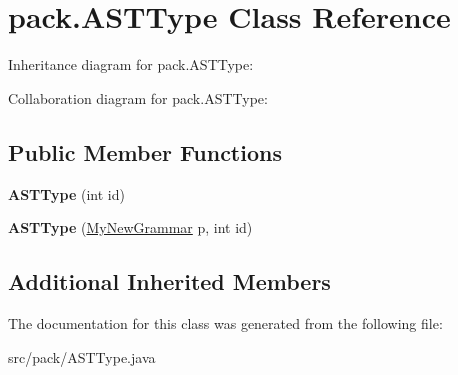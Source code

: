 \hypertarget{classpack_1_1_a_s_t_type}{}\section{pack.\+A\+S\+T\+Type Class Reference}
\label{classpack_1_1_a_s_t_type}


Inheritance diagram for pack.\+A\+S\+T\+Type\+:


Collaboration diagram for pack.\+A\+S\+T\+Type\+:
\subsection*{Public Member Functions}
\begin{DoxyCompactItemize}
\item 
{\bfseries A\+S\+T\+Type} (int id)\hypertarget{classpack_1_1_a_s_t_type_a591d0cb2add5c6327eb4b6ac34ef5885}{}\label{classpack_1_1_a_s_t_type_a591d0cb2add5c6327eb4b6ac34ef5885}

\item 
{\bfseries A\+S\+T\+Type} (\hyperlink{classpack_1_1_my_new_grammar}{My\+New\+Grammar} p, int id)\hypertarget{classpack_1_1_a_s_t_type_a686f76d1bf82aff1f322f4334a90f848}{}\label{classpack_1_1_a_s_t_type_a686f76d1bf82aff1f322f4334a90f848}

\end{DoxyCompactItemize}
\subsection*{Additional Inherited Members}


The documentation for this class was generated from the following file\+:\begin{DoxyCompactItemize}
\item 
src/pack/A\+S\+T\+Type.\+java\end{DoxyCompactItemize}
